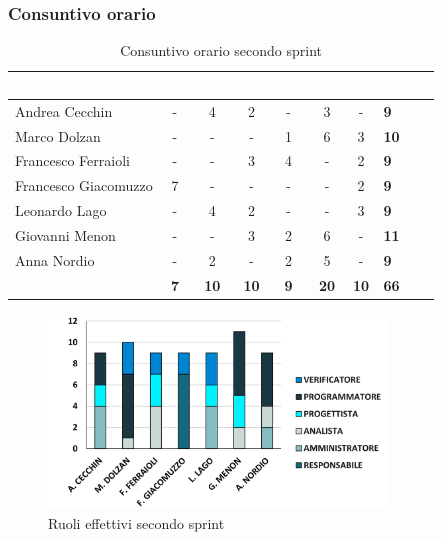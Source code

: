 \subsubsection{Consuntivo orario}
{
\setlength{\tabcolsep}{10pt}
\renewcommand{\arraystretch}{1.5}
\begin{table}[h!]
    \centering
    \begin{tabularx}{\textwidth}{| l | c | c | c | c | c | c | X |}
        \hline
        \rowcolor{headerrow} \textbf{\textcolor{white}{Membro}} & \textbf{\textcolor{white}{R.}} & \textbf{\textcolor{white}{Am.}} & \textbf{\textcolor{white}{Pj.}} & \textbf{\textcolor{white}{An.}} & \textbf{\textcolor{white}{Pg.}} & \textbf{\textcolor{white}{V.}} & \textbf{\textcolor{white}{Totale}} \\
        \hline
        Andrea Cecchin & - & 4 & 2 & - & 3 & - & \textbf{9} \\
        \hline
        Marco Dolzan & - & - & - & 1 & 6 & 3 & \textbf{10} \\
        \hline
        Francesco Ferraioli & - & - & 3 & 4 & - & 2 & \textbf{9} \\
        \hline  
        Francesco Giacomuzzo & 7 & - & - & - & - & 2 & \textbf{9} \\
        \hline
        Leonardo Lago & - & 4 & 2 & - & - & 3 & \textbf{9} \\
        \hline
        Giovanni Menon & - & - & 3 & 2 & 6 & - & \textbf{11} \\
        \hline
        Anna Nordio & - & 2 & - & 2 & 5 & - & \textbf{9} \\
        \hline
    \cellcolor{headerrow} \textbf{\textcolor{white}{Totale}} & \textbf{7} & \textbf{10} & \textbf{10} & \textbf{9} & \textbf{20} & \textbf{10} & \textbf{66} \\
        \hline
    \end{tabularx} 
    \caption{Consuntivo orario secondo sprint}
    \label{tab:consuntivoorariosecondosprint}
\end{table}
}

\begin{figure}[h!]
    \centering
    \includegraphics[width=0.8\textwidth]{cons2ruoli.png}
    \caption{Ruoli effettivi secondo sprint}
    \label{fig:consuntivootariosecondosprint}
\end{figure}

